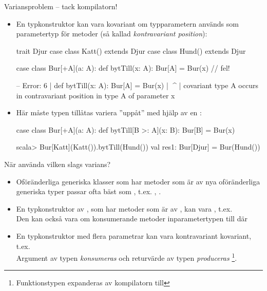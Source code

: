 \begin{Slide}{Variansproblem -- tack kompilatorn!}
\begin{itemize}\SlideFontSmall
\item En typkonstruktor kan  vara kovariant om typparametern används som parametertyp för metoder (så kallad \emph{kontravariant position}):
\begin{CodeSmall}
trait Djur
case class Katt() extends Djur
case class Hund() extends Djur

case class Bur[+A](a: A): 
  def bytTill(x: A): Bur[A] = Bur(x)     // fel!
\end{CodeSmall}
\pause
\begin{REPLsmall}
-- Error:
6 |  def bytTill(x: A): Bur[A] = Bur(x)
  |          ^^^^
  |  covariant type A occurs in contravariant position in type A of parameter x
\end{REPLsmall}
\pause
\item Här måste typen tillåtas variera ''uppåt'' med hjälp av en :
\begin{CodeSmall}
case class Bur[+A](a: A): 
  def bytTill[B >: A](x: B): Bur[B] = Bur(x)
\end{CodeSmall}
\begin{REPLsmall}
scala> Bur[Katt](Katt()).bytTill(Hund())
val res1: Bur[Djur] = Bur(Hund())
\end{REPLsmall}
\end{itemize}
\end{Slide}

\begin{Slide}{När använda vilken slags varians?}
\begin{itemize}\SlideFontTiny
\item Oföränderliga generiska klasser som har metoder som är  av nya oföränderliga generiska typer passar ofta bäst som , t.ex. ,  . 
\item En typkonstruktor av , som har metoder som är  av , kan vara , t.ex. 
\\Den kan också vara  om konsumerande metoder  inparametertypen till  där 

\item En typkonstruktor med flera parametrar kan vara  kontravariant  kovariant, t.ex.  
\\Argument av typen  \emph{konsumeras} och returvärde av typen  \emph{produceras}
\footnote{\SlideFontTiny Funktionstypen  expanderas av kompilatorn till  }.
\end{itemize}
\end{Slide}


